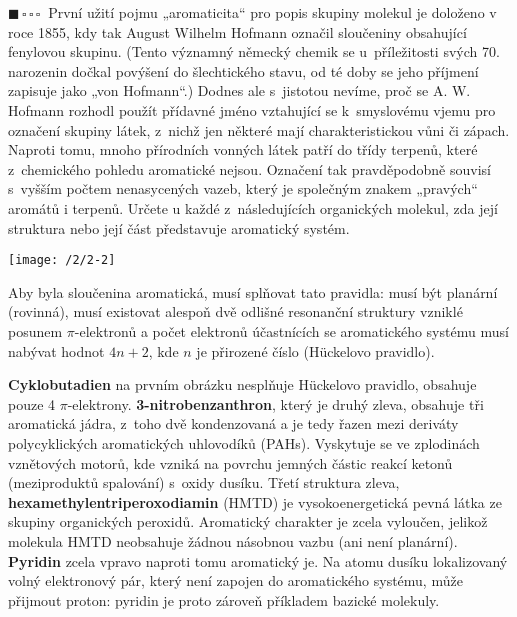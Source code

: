 \documentclass{book}
\newcommand{\jeden}{$\blacksquare \, \square \, \square \, \square \; \; $}
\renewenvironment{quotation}{\par}{\par} %
\begin{document}
\newpage %
\begin{quotation}
\jeden První užití pojmu „aromaticita“ pro popis skupiny molekul je doloženo
v roce 1855, kdy tak August Wilhelm Hofmann označil sloučeniny obsahující
fenylovou skupinu. (Tento významný německý chemik se u~příležitosti
svých 70. narozenin dočkal povýšení do šlechtického stavu, od té doby
se jeho příjmení zapisuje jako „von Hofmann“.) Dodnes ale s\ jistotou
nevíme, proč se A. W. Hofmann rozhodl použít přídavné jméno vztahující
se k~smyslovému vjemu pro označení skupiny látek, z~nichž jen některé
mají charakteristickou vůni či zápach. Naproti tomu, mnoho přírodních
vonných látek patří do třídy terpenů, které z~chemického pohledu aromatické
nejsou. Označení tak pravděpodobně souvisí s~vyšším počtem nenasycených
vazeb, který je společným znakem „pravých“ aromátů i terpenů. Určete
u každé z~následujících organických molekul, zda její struktura nebo
její část představuje aromatický systém. 
\end{quotation} \dotfill \par 
\begin{center}
\texttt{[image: /2/2-2]}
\end{center}
 

Aby byla sloučenina aromatická, musí splňovat tato pravidla: musí
být planární (rovinná), musí existovat alespoň dvě odlišné resonanční
struktury vzniklé posunem $\pi$-elektronů a počet elektronů účastnících
se aromatického systému musí nabývat hodnot $4n+2$, kde $n$ je přirozené číslo (Hückelovo pravidlo).

\textbf{Cyklobutadien} na prvním obrázku nesplňuje Hückelovo pravidlo,
obsahuje pouze 4 $\pi$-elektrony. \textbf{3-nit\-roben\-zan\-thron}, který
je druhý zleva, obsahuje tři aromatická jádra, z~toho dvě kondenzovaná
a je tedy řazen mezi deriváty polycyklických aromatických uhlovodíků
(PAHs). Vyskytuje se ve zplodinách vznětových motorů, kde vzniká na
povrchu jemných částic reakcí ketonů (meziproduktů spalování) s~oxidy
dusíku. Třetí struktura zleva, \textbf{hexamethylentriperoxodiamin}
(HMTD) je vysokoenergetická pevná látka ze skupiny organických peroxidů.
Aromatický charakter je zcela vyloučen, jelikož molekula HMTD neobsahuje
žádnou násobnou vazbu (ani není planární). \textbf{Pyridin} zcela vpravo
naproti tomu aromatický je. Na atomu dusíku lokalizovaný volný elektronový pár, který
není zapojen do aromatického systému, může přijmout proton: pyridin
je proto zároveň příkladem bazické molekuly.
\end{document}
